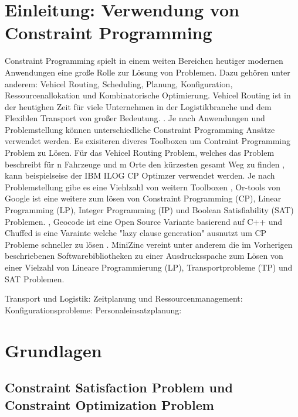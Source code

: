 




\tableofcontents

\clearpage
{}


\section{Einleitung: Verwendung von Constraint Programming}
\label{sec:Einleitung: Verwendung von Constraint Programming}
Constraint Programming spielt in einem weiten Bereichen heutiger modernen
Anwendungen eine große Rolle zur Lösung von Problemen. Dazu gehören unter
anderem: Vehicel Routing, Scheduling, Planung, Konfiguration,
Ressourcenallokation und Kombinatorische Optimierung. Vehicel Routing ist in der
heutighen Zeit für viele Unternehmen in der Logistikbranche und dem Flexiblen
Transport von großer Bedeutung. \cite[1]{delec22jo}. Je nach Anwendungen und
Problemstellung können unterschiedliche Constraint Programming Ansätze verwendet
werden. Es exisiteren diveres Toolboxen um Contraint Programming Problem zu
Lösen. Für das Vehicel Routing Problem, welches das Problem beschreibt für n
Fahrzeuge und m Orte den kürzesten gesamt Weg zu finden \cite[222]{labor18joa},
kann beispielseise der IBM ILOG CP Optimzer verwendet werden.\cite{IBMIwe} Je
nach Problemstellung gibe es eine Viehlzahl von weitern Toolboxen
\cite{Solviwea}, Or-tools von Google ist eine weitere zum lösen von Constraint
Programming (CP), Linear Programming (LP), Integer Programming (IP) und Boolean
Satisfiability (SAT) Problemen. \cite{ORToowe}, Geocode ist eine Open Source
Variante basierend auf C++ \cite{GECODwe} und Chuffed is eine Varainte welche
"lazy clause generation" ausnutzt um CP Probleme schneller zu lösen
\cite{Chuff24co}. MiniZinc vereint unter anderem die im Vorherigen beschriebenen
Softwarebibliotheken zu einer Ausdrucksspache zum Lösen von einer Vielzahl von
Lineare Programmierung (LP), Transportprobleme (TP) und SAT Problemen.
\cite{MiniZwe}


Transport und Logistik: Zeitplanung und Ressourcenmanagement:
Konfigurationsprobleme: Personaleinsatzplanung:

\cite[1-5]{rossi06bo}

\section{Grundlagen}
\subsection{Constraint Satisfaction Problem und Constraint Optimization Problem} 
\label{sec:Constraint Satisfaction Problem und Constraint Optimization Problem}

